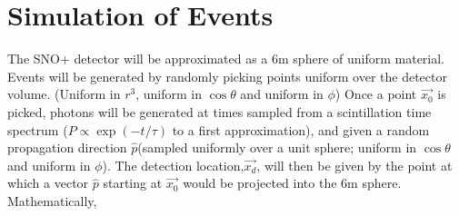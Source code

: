 \documentclass{article}
\begin{document}
\section*{Simulation of Events}

The SNO+ detector will be approximated as a 6m sphere of uniform
material.  Events will be generated by randomly picking points uniform
over the detector volume.  (Uniform in $r^3$, uniform in $\cos \theta$
and uniform in $\phi$) Once a point $\vec{x_0}$ is picked, photons
will be generated at times sampled from a scintillation time spectrum
($P \propto \exp(-t/\tau)$ to a first approximation), and given a
random propagation direction $\hat{p}$(sampled uniformly over a unit
sphere; uniform in $\cos \theta$ and uniform in $\phi$).  The
detection location,$\vec{x_d}$, will then be given by the point at
which a vector $\hat{p}$ starting at $\vec{x_0}$ would be projected
into the 6m sphere.  Mathematically,
\end{document}
